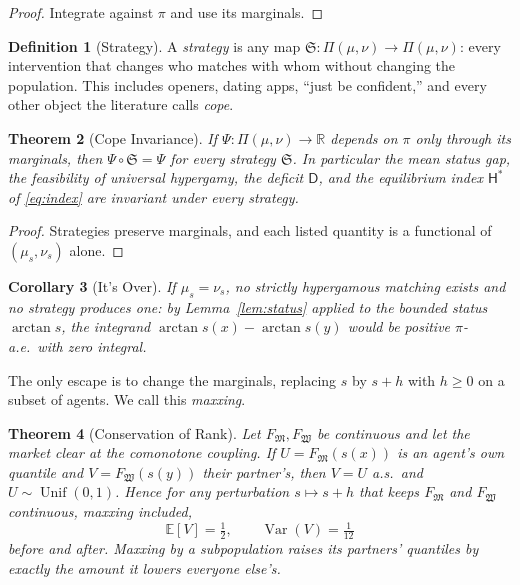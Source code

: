 \documentclass[11pt]{article}
\newtheorem{theorem}{Theorem}[section]
\newtheorem{corollary}[theorem]{Corollary}
\theoremstyle{definition}
\newtheorem{definition}[theorem]{Definition}
\theoremstyle{remark}
\newcommand{\M}{\mathfrak{M}}
\newcommand{\W}{\mathfrak{W}}
\newcommand{\R}{\mathbb{R}}
\newcommand{\D}{\mathsf{D}}
\newcommand{\Hy}{\mathsf{H}}
\DeclareMathOperator{\Unif}{Unif}
\DeclareMathOperator{\Var}{Var}
\begin{document}
\begin{proof}
  Integrate against $\pi$ and use its marginals.
\end{proof}

\begin{definition}[Strategy]\label{def:strategy}
  A \emph{strategy} is any map
  $\mathfrak{S}:\Pi(\mu,\nu)\to\Pi(\mu,\nu)$: every intervention that
  changes who matches with whom without changing the population. This
  includes openers, dating apps, ``just be confident,'' and every
  other object the literature calls \emph{cope}.
\end{definition}

\begin{theorem}[Cope Invariance]\label{thm:cope}
  If $\Psi:\Pi(\mu,\nu)\to\R$ depends on $\pi$ only through its
  marginals, then $\Psi\circ\mathfrak{S} = \Psi$ for every strategy
  $\mathfrak{S}$. In particular the mean status gap, the feasibility
  of universal hypergamy, the deficit $\D$, and the equilibrium index
  $\Hy^*$ of \eqref{eq:index} are invariant under every strategy.
\end{theorem}

\begin{proof}
  Strategies preserve marginals, and each listed quantity is a
  functional of $(\mu_s,\nu_s)$ alone.
\end{proof}

\begin{corollary}[It's Over]\label{cor:over}
  If $\mu_s = \nu_s$, no strictly hypergamous matching exists and no
  strategy produces one: by Lemma~\ref{lem:status} applied to the
  bounded status $\arctan s$, the integrand $\arctan s(x)-\arctan s(y)$
  would be positive $\pi$-a.e.\ with zero integral.
\end{corollary}

The only escape is to change the marginals, replacing $s$ by $s+h$
with $h\ge0$ on a subset of agents. We call this \emph{maxxing}.

\begin{theorem}[Conservation of Rank]\label{thm:rank}
  Let $F_\M, F_\W$ be continuous and let the market clear at the
  comonotone coupling. If $U = F_\M(s(x))$ is an agent's own quantile
  and $V = F_\W(s(y))$ their partner's, then $V = U$ a.s.\ and
  $U\sim\Unif(0,1)$. Hence for any perturbation $s\mapsto s+h$ that
  keeps $F_\M$ and $F_\W$ continuous, maxxing included,
  \begin{equation}
    \mathbb{E}[V] = \tfrac12, \qquad \Var(V) = \tfrac1{12}
  \end{equation}
  before and after. Maxxing by a subpopulation raises its partners'
  quantiles by exactly the amount it lowers everyone else's.
\end{theorem}
\end{document}
